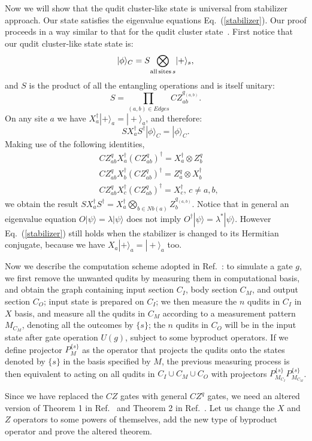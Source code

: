 \documentclass[aps,amsfonts,pra,twocolumn,showpacs]{revtex4-1}
\newcommand{\be}{\begin{equation}}
\newcommand{\ee}{\end{equation}}
\begin{document}
	Now we will show that the qudit cluster-like state is universal from stabilizer approach. Our state satisfies the eigenvalue equations Eq.~(\ref{stabilizer}). Our proof proceeds in a way similar to that for the qudit cluster state~\cite{Zhou2003}. First notice that our qudit cluster-like state state is:
		\be
		|\phi\rangle_C = S \underset{{\rm all \, sites} \, s}{\bigotimes}|+\rangle_s,
		\ee
	and $S$ is the product of all the entangling operations and is itself unitary:
		\be
		S = \prod_{(a, b) \in Edges} CZ_{ab}^{q_{(a, b)}}.
		\ee
	On any site $a$ we have $X^\dagger_a |+\rangle_a = |+\rangle_a$, and therefore:
		\be
		S X^\dagger_a S^\dagger |\phi\rangle_C = |\phi\rangle_C.
		\ee
	Making use of the following identities,
		\begin{align}
		& CZ_{ab}^q X_a^\dagger (CZ_{ab}^q)^\dagger = X_a^\dagger \otimes Z_b^q \\
		& CZ_{ab}^q X_b^\dagger (CZ_{ab}^q)^\dagger = Z_a^q \otimes X_b^\dagger \\
		& CZ_{ab}^q X_c^\dagger (CZ_{ab}^q)^\dagger = X_c^\dagger, \, c \neq a, b,
		\end{align}
	we obtain the result $S X^\dagger_a S^\dagger = X_a^\dagger \underset{b \in Nb(a)}{\bigotimes} Z_b^{q_{(a, b)}}$. Notice that in general an eigenvalue equation $O|\psi\rangle=\lambda|\psi\rangle$ does not imply $O^\dagger|\psi\rangle=\lambda^*|\psi\rangle$. However Eq.~(\ref{stabilizer}) still holds when the stabilizer is changed to its Hermitian conjugate, because we have $X_a |+\rangle_a = |+\rangle_a$ too.
	
	Now we describe the computation scheme adopted in Ref.~\cite{Raussendorf2003, Zhou2003}: to simulate a gate $g$, we first remove the unwanted qudits by measuring them in computational basis, and obtain the graph containing input section $C_I$, body section $C_M$, and output section $C_O$; input state is prepared on $C_I$; we then measure the $n$ qudits in $C_I$ in $X$ basis, and measure all the qudits in $C_M$ according to a measurement pattern $M_{C_M}$, denoting all the outcomes by $\{s\}$; the $n$ qudits in $C_O$ will be in the input state after gate operation $U(g)$, subject to some byproduct operators. If we define projector $P^{\{s\}}_M$ as the operator that projects the qudits onto the states denoted by $\{s\}$ in the basis specified by $M$, the previous measuring process is then equivalent to acting on all qudits in $C_I \cup C_M \cup C_O$ with projectors $P^{\{s\}}_{M_{C_I}} P^{\{s\}}_{M_{C_M}}$.
	
	Since we have replaced the $CZ$ gates with general $CZ^q$ gates, we need an altered version of Theorem 1 in Ref.~\cite{Raussendorf2003} and Theorem 2 in Ref.~\cite{Zhou2003}. Let us change the $X$ and $Z$ operators to some powers of themselves, add the new type of byproduct operator and prove the altered theorem.
	
\end{document}
